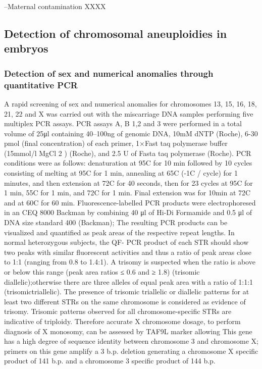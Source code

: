 
--Maternal contamination XXXX 

\subsection*{Detection of chromosomal aneuploidies in embryos} 
\subsubsection*{Detection of sex and numerical anomalies through quantitative PCR}
A rapid screening of sex and numerical anomalies for chromosomes 13, 15, 16, 18, 21, 22 and X was carried out with the miscarriage DNA samples performing five multiplex PCR assays. PCR assays A, B 1,2 and 3 were performed in a total volume of 25μl containing 40–100ng of genomic DNA, 10mM dNTP (Roche), 6-30 pmol (final concentration) of each primer, 1×Fast taq polymerase buffer (15mmol/l MgCl 2 ) (Roche), and 2.5 U of Fasta taq polymerase (Roche). PCR conditions were as follows: denaturation at 95\textdegree C for 10 min followed by 10 cycles consisting of melting at 95\textdegree C for 1 min, annealing at 65\textdegree C (-1\textdegree C / cycle) for 1 minutes, and then extension at 72\textdegree C for 40 seconds, then for 23 cycles at 95\textdegree C for 1 min, 55\textdegree C for 1 min, and 72\textdegree C for 1 min. Final extension was for 10min at 72\textdegree C and at 60\textdegree C for 60 min. Fluorescence-labelled PCR products were electrophoresed in an CEQ 8000 Backman by combining 40 μl of Hi-Di Formamide and 0.5 μl of DNA size standard 400 (Backman); The resulting PCR products can be visualized and quantified as peak areas of the respective repeat lengths. In normal heterozygous subjects, the QF- PCR product of each STR should show two peaks with similar fluorescent activities and thus a ratio of peak areas close to 1:1 (ranging from 0.8 to 1.4:1). A trisomy is suspected when the ratio is  above or below this range (peak area ratios ≤ 0.6 and ≥ 1.8) (trisomic diallelic);otherwise there are three alleles of equal peak area with a ratio of 1:1:1 (trisomictriallelic). The presence of trisomic triallelic or diallelic patterns for at least two different STRs on the same chromosome is considered as evidence of trisomy. Trisomic patterns observed for all chromosome-specific STRs are indicative of triploidy. Therefore accurate X chromosome dosage, to perform diagnosis of X monosomy, can be assessed by TAF9L marker allowing This gene has a high degree of sequence identity between chromosome 3 and chromosome X; primers on this gene amplify a 3 b.p. deletion generating a chromosome X specific product of 141 b.p. and a chromosome 3 specific product of 144 b.p.

